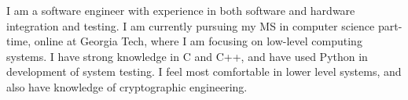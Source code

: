\documentclass[letter,10pt]{article}
\begin{document}
I am a software engineer with experience in both software and hardware integration and testing. I am currently pursuing my MS in computer science part-time, online at Georgia Tech, where I am focusing on low-level computing systems. I have strong knowledge in C and C++, and have used Python in development of system testing. I feel most comfortable in lower level systems, and also have knowledge of cryptographic engineering.
\end{document}
